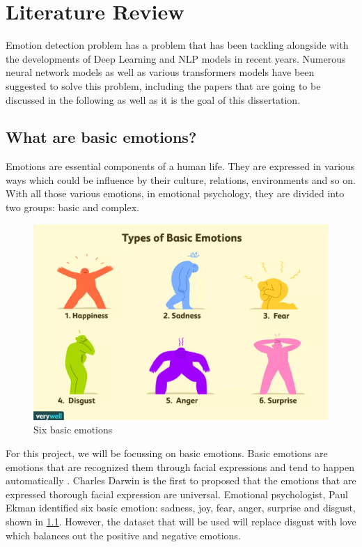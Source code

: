 
\chapter{Literature Review}

Emotion detection problem has a problem that has been tackling alongside with the developments of Deep Learning and NLP models in recent years. 
Numerous neural network models as well as various transformers models have been suggested to solve this problem, including the papers that are going to be discussed in the following as well as it is the goal of this dissertation.

\section{What are basic emotions?}
Emotions are essential components of a human life. They are expressed in various ways which could be influence by their culture, relations, environments and so on. With all those various emotions, in emotional psychology, they are divided into two groups: basic and complex.

\begin{figure}[ht]
    \centerline{\includegraphics[scale=0.72]{Figures/six_emotions.png}}
    \caption{Six basic emotions}
    \label{fig:emotions}
 \end{figure}

For this project, we will be focussing on basic emotions. Basic emotions are emotions that are recognized them through facial expressions and tend to happen automatically \cite{Uwa_2023}. Charles Darwin is the first to proposed that the emotions that are expressed thorough facial expression are universal. Emotional psychologist, Paul Ekman identified six basic emotion: sadness, joy, fear, anger, surprise and disgust, shown in \ref{fig:emotions}. However, the dataset that will be used will replace disgust with love which balances out the positive and negative emotions.

